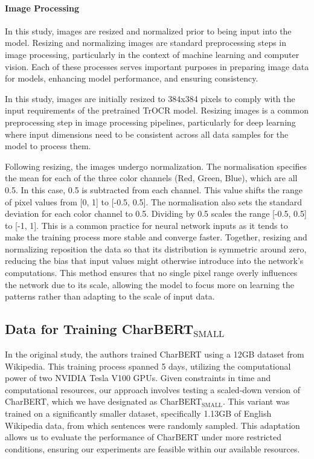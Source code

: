 \paragraph*{Image Processing}
\label{par:3_image_processing}
In this study, images are resized and normalized prior to being input into the model. Resizing and normalizing images are standard preprocessing steps in image processing, particularly in the context of machine learning and computer vision. Each of these processes serves important purposes in preparing image data for models, enhancing model performance, and ensuring consistency. 

In this study, images are initially resized to 384x384 pixels to comply with the input requirements of the pretrained TrOCR model. Resizing images is a common preprocessing step in image processing pipelines, particularly for deep learning where input dimensions need to be consistent across all data samples for the model to process them.

Following resizing, the images undergo normalization. The normalisation specifies the mean for each of the three color channels (Red, Green, Blue), which are all 0.5. In this case, 0.5 is subtracted from each channel. This value shifts the range of pixel values from [0, 1] to [-0.5, 0.5]. The normalisation also sets the standard deviation for each color channel to 0.5. Dividing by 0.5 scales the range [-0.5, 0.5] to [-1, 1]. This is a common practice for neural network inputs as it tends to make the training process more stable and converge faster. Together, resizing and normalizing reposition the data so that its distribution is symmetric around zero, reducing the bias that input values might otherwise introduce into the network's computations. This method ensures that no single pixel range overly influences the network due to its scale, allowing the model to focus more on learning the patterns rather than adapting to the scale of input data.
\subsection{Data for Training CharBERT$_{\text{SMALL}}$}
\label{subsec:3_data_for_training_charbert}
In the original study, the authors trained CharBERT using a 12GB dataset from Wikipedia. This training process spanned 5 days, utilizing the computational power of two NVIDIA Tesla V100 GPUs. Given constraints in time and computational resources, our approach involves testing a scaled-down version of CharBERT, which we have designated as CharBERT$_{\text{SMALL}}$. This variant was trained on a significantly smaller dataset, specifically 1.13GB of English Wikipedia data, from which sentences were randomly sampled. This adaptation allows us to evaluate the performance of CharBERT under more restricted conditions, ensuring our experiments are feasible within our available resources.
